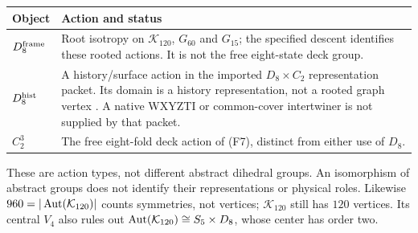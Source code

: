 \begin{center}
\begin{tabularx}{\textwidth}{@{}p{}X@{}}
\toprule Object & Action and status \\\midrule
$D_8^{\rm frame}$ & Root isotropy on $\mathcal K_{120}$, $G_{60}$ and $G_{15}$; the specified descent identifies these rooted actions. It is not the free eight-state deck group.\\
$D_8^{\rm hist}$ & A history/surface action in the imported $D_8\times C_2$ representation packet. Its domain is a history representation, not a rooted graph vertex \citep{historyframe2026}. A native WXYZTI or common-cover intertwiner is not supplied by that packet.\\
$C_2^3$ & The free eight-fold deck action of (F7), distinct from either use of $D_8$.\\
\bottomrule
\end{tabularx}
\end{center}
These are action types, not different abstract dihedral groups. An isomorphism of abstract groups does not identify their representations or physical roles. Likewise $960=|\operatorname{Aut}(\mathcal K_{120})|$ counts symmetries, not vertices; $\mathcal K_{120}$ still has $120$ vertices. Its central $V_4$ also rules out $\operatorname{Aut}(\mathcal K_{120})\cong S_5\times D_8$, whose center has order two.
\endgroup
\setcounter{section}{2}
